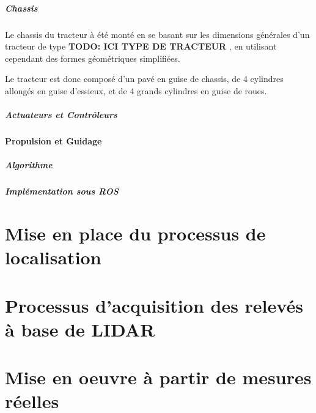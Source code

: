 \documentclass[12pt,a4paper]{report}
\begin{document}
			\paragraph{Chassis}
			Le chassis du tracteur à été monté en se basant sur les dimensions générales d'un tracteur de type \textbf{TODO: ICI TYPE DE TRACTEUR} , en utilisant cependant des formes géométriques simplifiées.
			\newline
			
			Le tracteur est donc composé d'un pavé en guise de chassis, de 4 cylindres allongés en guise d'essieux, et de 4 grands cylindres en guise de roues.
			
			\paragraph{Actuateurs et Contrôleurs}
		\subsubsection{Propulsion et Guidage}
			\paragraph{Algorithme}
			
			
			\paragraph{Implémentation sous ROS}
			
		
		

\chapter{Mise en place du processus de localisation}

\chapter{Processus d'acquisition des relevés à base de LIDAR}

\chapter{Mise en oeuvre à partir de mesures réelles}
\end{document}
